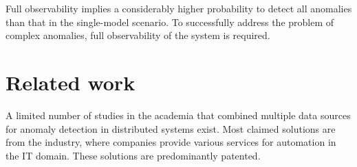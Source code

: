 \begin{table}[!t]
\caption{Results of the detection of the complex anomalies.}
\label{tab:rescomplex}
\end{table}

Full observability implies a considerably higher probability to detect all anomalies than that in the single-model scenario. To successfully address the problem of complex anomalies, full observability of the system is required.

\newpage

\section{Related work}
A limited number of studies in the academia that combined multiple data sources for anomaly detection in distributed systems exist. Most claimed solutions are from the industry, where companies provide various services for automation in the IT domain. These solutions are predominantly patented. 

